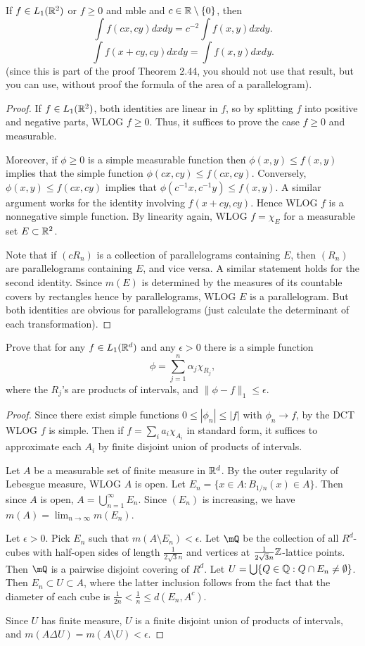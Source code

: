 \documentclass{article}
\begin{document}
 If $f \in L_1(\mathbb{R}^2)$ or $f \ge 0$ and mble and $c \in \mathbb{R} \setminus \{0\}$, then
$$ \int f (cx, cy) dx dy  =  c^{-2} \int f(x,y) dx dy.$$
$$\int f (x + cy, cy) dx dy  =  \int f(x,y) dx dy.$$
(since this is part of the proof Theorem 2.44, you should not use that result,
but you can use, without proof the formula of the area of a parallelogram).

\begin{proof}
If $f \in L_1(\mathbb{R}^2)$, both identities are linear in $f$, so by splitting $f$ into positive and negative parts, WLOG $f \ge 0$.  Thus, it suffices to prove the case $f \ge 0$ and measurable.

Moreover, if $\phi \ge 0$ is a simple measurable function then $\phi(x,y) \le f(x,y)$ implies that  the simple function $\phi(cx,cy) \le f(cx, cy)$. Conversely, $\phi(x,y) \le f(cx, cy)$ implies that $\phi(c^{-1} x, c^{-1}y) \le f(x,y)$.  A similar argument works for the identity involving $f(x +cy, cy)$.  Hence WLOG $f$ is a nonnegative simple function. By linearity again, WLOG $f = \chi_E$ for a measurable set $E \subset \mathbb{R}^2$.

Note that if $(cR_n)$ is a collection of parallelograms containing $E$, then $(R_n)$ are parallelograms containing $E$, and vice versa. A similar statement holds for the second identity. Ssince $m(E)$ is determined by the measures of its countable covers by rectangles hence by parallelograms, WLOG $E$ is a parallelogram.  But both identities are obvious for parallelograms (just calculate the determinant of each transformation).
\end{proof}

 Prove that for any $f \in L_1(\mathbb{R}^d)$ and any $\epsilon > 0$ there is a simple function
$$ \phi = \sum_{j=1}^n \alpha_j \chi_{R_j},$$
where the $R_j$'s are products of intervals, and $\|\phi - f\|_1 \le \epsilon$.
\begin{proof}
Since there exist simple functions $0 \le |\phi_n| \le |f|$ with $\phi_n \to f$, by the DCT WLOG $f$ is simple.  Then if $f = \sum_i a_i \chi_{A_i}$ in standard form, it suffices to approximate each $A_i$ by finite disjoint union of products of intervals.

Let $A$ be a measurable set of finite measure in $\mathbb{R}^d$.  By the outer regularity of Lebesgue measure, WLOG $A$ is open.  Let $E_n = \{x \in A : B_{1/n}(x) \in A\}$.  Then since $A$ is open, $A = \bigcup_{n=1}^\infty E_n$. Since $(E_n)$ is increasing, we have $m(A) = \lim_{n \to \infty} m(E_n)$.

Let $\epsilon > 0$.  Pick $E_n$ such that $m(A \setminus E_n) < \epsilon$.  Let $\mQ$ be the collection of all $R^d$-cubes with half-open sides of length $\frac 1 {2\sqrt 3 n}$ and vertices at $\frac 1 {2\sqrt 3 n} \mathbb{Z}$-lattice points. Then $\mQ$ is a pairwise disjoint covering of $R^d$. Let $U  = \bigcup \{Q \in \mathbb{Q} : Q \cap E_n \neq \emptyset\}$.  Then $E_n \subset U \subset A$, where the latter inclusion follows from the fact that the diameter of each cube is $\frac 1 {2n} < \frac 1 n \le d(E_n, A^c)$.  

Since $U$ has finite measure, $U$ is a finite disjoint union of products of intervals, and $m(A \Delta U) = m(A \setminus U) < \epsilon$.
\end{proof}
\end{document}
